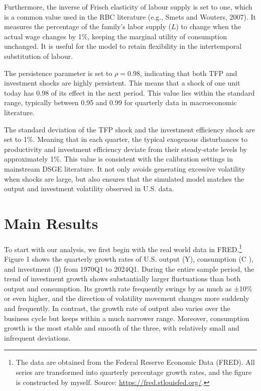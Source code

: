 \documentclass[12pt]{article}
\begin{document}
Furthermore, the inverse of Frisch elasticity of labour supply is set to one, which is a common value used in the RBC literature (e.g., Smets and Wouters, 2007). It measures the percentage of the family's labor supply (\(L\)) to change when the actual wage changes by 1\%, keeping the marginal utility of consumption unchanged. It is useful for the model to retain flexibility in the intertemporal substitution of labour.

The persistence parameter is set to $\rho = 0.98$, indicating that both TFP and investment shocks are highly persistent. This means that a shock of one unit today has 0.98 of its effect in the next period. This value lies within the standard range, typically between 0.95 and 0.99 for quarterly data in macroeconomic literature.

The standard deviation of the TFP shock and the investment efficiency shock are set to 1\%. Meaning that in each quarter, the typical exogenous disturbances to productivity and investment efficiency deviate from their steady-state levels by approximately 1\%. This value is consistent with the calibration settings in mainstream DSGE literature. It not only avoids generating excessive volatility when shocks are large, but also ensures that the simulated model matches the output and investment volatility observed in U.S. data.


\section{Main Results}

To start with our analysis, we first begin with the real world data in FRED.\footnote{The data are obtained from the Federal Reserve Economic Data (FRED). All series are transformed into quarterly percentage growth rates, and the figure is constructed by myself. Source: \url{https://fred.stlouisfed.org/}.} Figure 1 shows the quarterly growth rates of U.S. output (Y), consumption (C ), and investment (I) from 1970Q1 to 2024Q1. During the entire sample period, the trend of investment growth shows substantially larger fluctuations than both output and consumption. Its growth rate frequently swings by as much as ±10\% or even higher, and the direction of volatility movement changes more suddenly and frequently. In contrast, the growth rate of output also varies over the business cycle but keeps within a much narrower range. Moreover, consumption growth is the most stable and smooth of the three, with relatively small and infrequent deviations.
\end{document}
